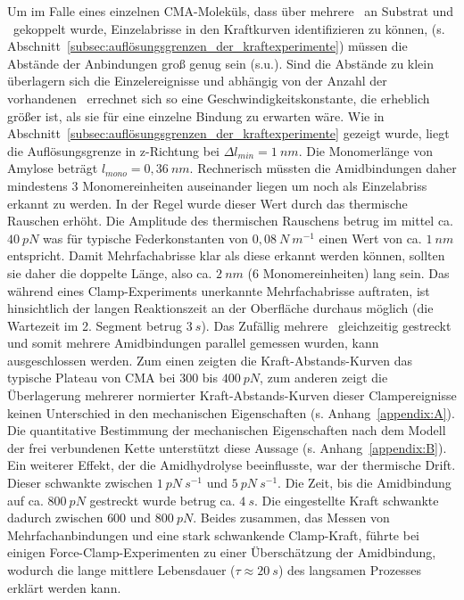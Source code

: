 
Um im Falle eines einzelnen \ac{CMA}-Moleküls, dass über mehrere \amid~an Substrat und \spitze~gekoppelt wurde, Einzelabrisse in den Kraftkurven identifizieren zu können,  (s. Abschnitt~\ref{subsec:auflösungsgrenzen_der_kraftexperimente}) müssen die Abstände der Anbindungen groß genug sein (s.u.). Sind die Abstände zu klein überlagern sich die Einzelereignisse und abhängig von der Anzahl der vorhandenen \amide~errechnet sich so eine Geschwindigkeitskonstante, die erheblich größer ist, als sie für eine einzelne Bindung zu erwarten wäre. Wie in Abschnitt~\ref{subsec:auflösungsgrenzen_der_kraftexperimente} gezeigt wurde, liegt die Auflösungsgrenze in z-Richtung bei $\Delta l_{min} = 1~nm$. Die Monomerlänge von Amylose beträgt $l_{mono} = 0,36~nm$. Rechnerisch müssten die Amidbindungen daher mindestens 3 Monomereinheiten auseinander liegen um noch als Einzelabriss erkannt zu werden. In der Regel wurde dieser Wert durch das thermische Rauschen erhöht. Die Amplitude des thermischen Rauschens betrug im mittel ca. $40~pN$ was für typische Federkonstanten von $0,08~N~m^{-1}$ einen Wert von ca. $1~nm$ entspricht. Damit Mehrfachabrisse klar als diese erkannt werden können, sollten sie daher die doppelte Länge, also ca. $2~nm$ (6 Monomereinheiten) lang sein. Das während eines Clamp-Experiments unerkannte Mehrfachabrisse auftraten, ist hinsichtlich der langen Reaktionszeit an der Oberfläche durchaus möglich (die Wartezeit im 2. Segment betrug $3~s$). Das Zufällig mehrere \spacer~gleichzeitig gestreckt und somit mehrere Amidbindungen parallel gemessen wurden, kann ausgeschlossen werden. Zum einen zeigten die Kraft-Abstands-Kurven das typische Plateau von \ac{CMA} bei $300$ bis $400~pN$, zum anderen zeigt die Überlagerung mehrerer normierter Kraft-Abstands-Kurven dieser Clampereignisse keinen Unterschied in den mechanischen Eigenschaften (s. Anhang~\ref{appendix:A}). Die quantitative Bestimmung der mechanischen Eigenschaften nach dem Modell der frei verbundenen Kette unterstützt diese Aussage (s. Anhang~\ref{appendix:B}).\\
 Ein weiterer Effekt, der die Amidhydrolyse beeinflusste, war der thermische Drift. Dieser schwankte zwischen $1~pN~s^{-1}$ und $5~pN~s^{-1}$. Die Zeit, bis die Amidbindung auf ca. $800~pN$ gestreckt wurde betrug ca. $4~s$. Die eingestellte Kraft schwankte dadurch zwischen $600$ und $800~pN$. Beides zusammen, das Messen von Mehrfachanbindungen und eine stark schwankende Clamp-Kraft, führte bei einigen Force-Clamp-Experimenten zu einer Überschätzung der Amidbindung, wodurch die lange mittlere Lebensdauer ($\tau \approx 20~s$) des langsamen Prozesses erklärt werden kann.\\

